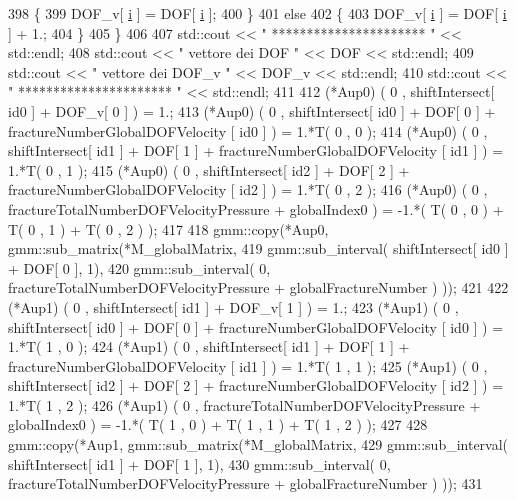 \begin{DoxyCode}
398             \{
399                 DOF\_v[ \hyperlink{matrici_8m_a6f6ccfcf58b31cb6412107d9d5281426}{i} ] = DOF[ \hyperlink{matrici_8m_a6f6ccfcf58b31cb6412107d9d5281426}{i} ];
400             \}
401             \textcolor{keywordflow}{else}
402             \{
403                 DOF\_v[ \hyperlink{matrici_8m_a6f6ccfcf58b31cb6412107d9d5281426}{i} ] = DOF[ \hyperlink{matrici_8m_a6f6ccfcf58b31cb6412107d9d5281426}{i} ] + 1.;
404             \}
405         \}
406         
407         std::cout << \textcolor{stringliteral}{" ********************** "} << std::endl;
408         std::cout << \textcolor{stringliteral}{" vettore dei DOF "} << DOF << std::endl;
409         std::cout << \textcolor{stringliteral}{" vettore dei DOF\_v "} << DOF\_v << std::endl;
410         std::cout << \textcolor{stringliteral}{" ********************** "} << std::endl;
411         
412         (*Aup0) ( 0 , shiftIntersect[ id0 ] + DOF\_v[ 0 ] )  = 1.;
413         (*Aup0) ( 0 , shiftIntersect[ id0 ] + DOF[ 0 ] + fractureNumberGlobalDOFVelocity [ id0 ] ) = 1.*T( 
      0 , 0 );
414         (*Aup0) ( 0 , shiftIntersect[ id1 ] + DOF[ 1 ] + fractureNumberGlobalDOFVelocity [ id1 ] ) = 1.*T( 
      0 , 1 );
415         (*Aup0) ( 0 , shiftIntersect[ id2 ] + DOF[ 2 ] + fractureNumberGlobalDOFVelocity [ id2 ] ) = 1.*T( 
      0 , 2 );
416         (*Aup0) ( 0 , fractureTotalNumberDOFVelocityPressure + globalIndex0 ) = -1.*( T( 0 , 0 ) + T( 0 , 1
       ) + T( 0 , 2 ) );
417         
418         gmm::copy(*Aup0, gmm::sub\_matrix(*M\_globalMatrix, 
419                 gmm::sub\_interval( shiftIntersect[ id0 ] + DOF[ 0 ], 1), 
420                 gmm::sub\_interval( 0, fractureTotalNumberDOFVelocityPressure + globalFractureNumber ) ));
421         
422         (*Aup1) ( 0 , shiftIntersect[ id1 ] + DOF\_v[ 1 ] )  = 1.;
423         (*Aup1) ( 0 , shiftIntersect[ id0 ] + DOF[ 0 ] + fractureNumberGlobalDOFVelocity [ id0 ] ) = 1.*T( 
      1 , 0 );
424         (*Aup1) ( 0 , shiftIntersect[ id1 ] + DOF[ 1 ] + fractureNumberGlobalDOFVelocity [ id1 ] ) = 1.*T( 
      1 , 1 );
425         (*Aup1) ( 0 , shiftIntersect[ id2 ] + DOF[ 2 ] + fractureNumberGlobalDOFVelocity [ id2 ] ) = 1.*T( 
      1 , 2 );
426         (*Aup1) ( 0 , fractureTotalNumberDOFVelocityPressure + globalIndex0 ) = -1.*( T( 1 , 0 ) + T( 1 , 1
       ) + T( 1 , 2 ) );
427         
428         gmm::copy(*Aup1, gmm::sub\_matrix(*M\_globalMatrix, 
429                 gmm::sub\_interval( shiftIntersect[ id1 ] + DOF[ 1 ], 1), 
430                 gmm::sub\_interval( 0, fractureTotalNumberDOFVelocityPressure + globalFractureNumber ) ));
431         

\end{DoxyCode}
